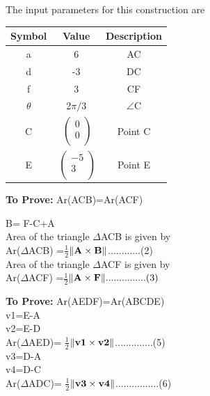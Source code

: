 \documentclass[10pt, a4paper]{article}
\newcommand{\myvec}[1]{\ensuremath{\begin{pmatrix}#1\end{pmatrix}}}
\let\vec\mathbf
\begin{document}
The input parameters for this construction are 
\begin{center}
\begin{tabular}{|c|c|c|}
	\hline
	\textbf{Symbol}&\textbf{Value}&\textbf{Description}\\
	\hline
	a&6&AC\\
	\hline
	d&-3&DC\\
	\hline
	f&3&CF\\
	\hline
	$\theta$& 2$\pi/3$&$ \angle $C\\ 
	\hline
	C&$\
	\begin{pmatrix}
		0 \\
		0 \\
	\end{pmatrix}$%
	&Point C\\
	\hline
		E&$\
	\begin{pmatrix}
		-5 \\
		3 \\
	\end{pmatrix}$%
	&Point E\\
	\hline
\end{tabular}
\end{center}
\textbf{To Prove:} Ar(ACB)=Ar(ACF)
		\begin{center}
	B= F-C+A\\
	Area of the triangle $\Delta$ACB is given by \\
Ar($\Delta$ACB) =$\frac{1}{2}$$\norm{\vec{A}\times\vec{B}}$............(2)\\
		Area of the triangle $\Delta$ACF is given by \\
 Ar($\Delta$ACF) =$\frac{1}{2}$$\norm{\vec{A}\times\vec{F}}...............(3)$
	\end{center}
	\textbf{To Prove:}  Ar(AEDF)=Ar(ABCDE)\\
	v1=E-A\\
	v2=E-D\\
	Ar($\Delta$AED)= 	$\frac{1}{2}$$\norm{\vec{v1}\times\vec{v2}}$..............(5)\\
	v3=D-A\\
	v4=D-C\\
	Ar($\Delta$ADC)= $\frac{1}{2}$$\norm{\vec{v3}\times\vec{v4}}$................(6)\\
\end{document}
